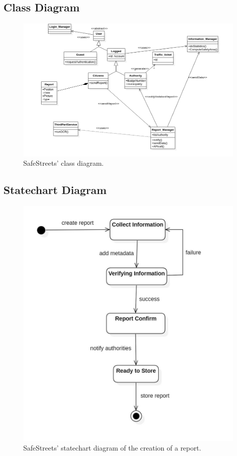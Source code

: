 \documentclass{report}
\begin{document}
\subsection{Class Diagram}
\begin{figure}[h!]
\begin{center}
\includegraphics[width=\textwidth]{./img/SWE1.png}
\end{center}
\caption{SafeStreets' class diagram.}
\label{fig:UML}
\end{figure} 

\newpage
\subsection{Statechart Diagram}
\begin{figure}[h!]
\begin{center}
\includegraphics[scale=0.4]{./img/img_Report.jpg}
\end{center}
\caption{SafeStreets' statechart diagram of the creation of a report.}
\label{fig:State1}
\end{figure} 
\end{document}
